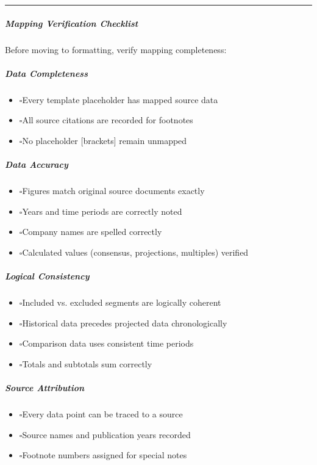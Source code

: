 \documentclass[11pt]{article}
\newcommand{\UncheckedBox}{$\square$}
\begin{document}
\vspace{0.5em}\hrule\vspace{0.5em}

\subparagraph{Mapping Verification Checklist}\mbox{}\par

Before moving to formatting, verify mapping completeness:


\subparagraph{Data Completeness}\mbox{}\par
\begin{itemize}[leftmargin=*,itemsep=2pt,topsep=2pt]
\item {} \UncheckedBox Every template placeholder has mapped source data
\item {} \UncheckedBox All source citations are recorded for footnotes
\item {} \UncheckedBox No placeholder [brackets] remain unmapped
\end{itemize}

\subparagraph{Data Accuracy}\mbox{}\par
\begin{itemize}[leftmargin=*,itemsep=2pt,topsep=2pt]
\item {} \UncheckedBox Figures match original source documents exactly
\item {} \UncheckedBox Years and time periods are correctly noted
\item {} \UncheckedBox Company names are spelled correctly
\item {} \UncheckedBox Calculated values (consensus, projections, multiples) verified
\end{itemize}

\subparagraph{Logical Consistency}\mbox{}\par
\begin{itemize}[leftmargin=*,itemsep=2pt,topsep=2pt]
\item {} \UncheckedBox Included vs. excluded segments are logically coherent
\item {} \UncheckedBox Historical data precedes projected data chronologically
\item {} \UncheckedBox Comparison data uses consistent time periods
\item {} \UncheckedBox Totals and subtotals sum correctly
\end{itemize}

\subparagraph{Source Attribution}\mbox{}\par
\begin{itemize}[leftmargin=*,itemsep=2pt,topsep=2pt]
\item {} \UncheckedBox Every data point can be traced to a source
\item {} \UncheckedBox Source names and publication years recorded
\item {} \UncheckedBox Footnote numbers assigned for special notes
\end{itemize}
\end{document}
